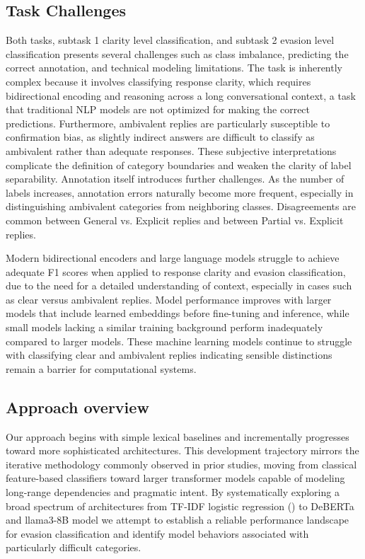 \documentclass[11pt]{article}
\begin{document}
\subsection{Task Challenges}
Both tasks, subtask 1 clarity level classification, and subtask 2 evasion level classification presents several challenges such as class imbalance, predicting the correct annotation, and technical modeling limitations. The task is inherently complex because it involves classifying response clarity, which requires bidirectional encoding and reasoning across a long conversational context, a task that traditional NLP models are not optimized for making the correct predictions. Furthermore, ambivalent replies are particularly susceptible to confirmation bias, as slightly indirect answers are difficult to classify as ambivalent rather than adequate responses. These subjective interpretations complicate the definition of category boundaries and weaken the clarity of label separability.
Annotation itself introduces further challenges. As the number of labels increases, annotation errors naturally become more frequent, especially in distinguishing ambivalent categories from neighboring classes. Disagreements are common between General vs. Explicit replies and between Partial vs. Explicit replies.

Modern bidirectional encoders and large language models struggle to achieve adequate F1 scores when applied to response clarity and evasion classification, due to the need for a detailed understanding of context, especially in cases such as clear versus ambivalent replies. Model performance improves with larger models that include learned embeddings before fine-tuning and inference, while small models lacking a similar training background perform inadequately compared to larger models. These machine learning models continue to struggle with classifying clear and ambivalent replies indicating sensible distinctions remain a barrier for computational systems.




\subsection{Approach overview}
Our approach begins with simple lexical baselines and incrementally progresses toward more sophisticated architectures. This development trajectory mirrors the iterative methodology commonly observed in prior studies, moving from classical feature-based classifiers toward larger transformer models capable of modeling long-range dependencies and pragmatic intent. By systematically exploring a broad spectrum of architectures from TF-IDF logistic regression (\citealp{sparck1972statistical, cox1958regression}) to DeBERTa \citep{DeBERTaV3} and llama3-8B model \citep{2024arXiv240721783G} we attempt to establish a reliable performance landscape for evasion classification and identify model behaviors associated with particularly difficult categories.
\end{document}
